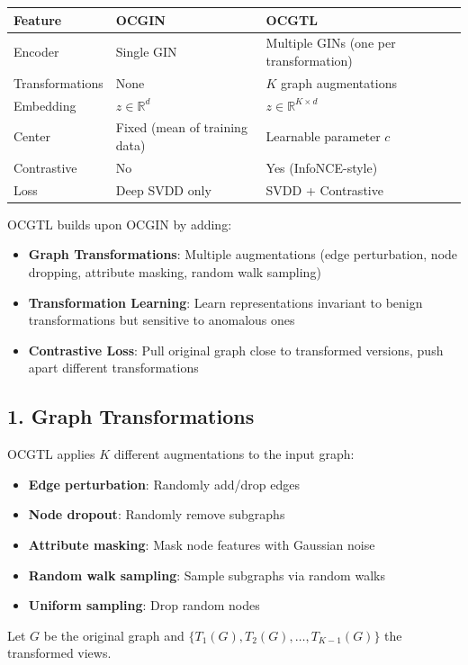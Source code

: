 \begin{table}[h]
\centering
\begin{tabular}{l|l|l}
Feature & OCGIN & OCGTL \\ \hline
Encoder & Single GIN & Multiple GINs (one per transformation) \\
Transformations & None & $K$ graph augmentations \\
Embedding & $z \in \mathbb{R}^{d}$ & $z \in \mathbb{R}^{K \times d}$ \\
Center & Fixed (mean of training data) & Learnable parameter $c$ \\
Contrastive & No & Yes (InfoNCE-style) \\
Loss & Deep SVDD only & SVDD + Contrastive
\end{tabular}
\end{table}

OCGTL builds upon OCGIN by adding:
\begin{itemize}
    \item \textbf{Graph Transformations}: Multiple augmentations (edge perturbation, node dropping, attribute masking, random walk sampling)
    \item \textbf{Transformation Learning}: Learn representations invariant to benign transformations but sensitive to anomalous ones
    \item \textbf{Contrastive Loss}: Pull original graph close to transformed versions, push apart different transformations
\end{itemize}

\subsection{1. Graph Transformations}
OCGTL applies $K$ different augmentations to the input graph:
\begin{itemize}
    \item \textbf{Edge perturbation}: Randomly add/drop edges
    \item \textbf{Node dropout}: Randomly remove subgraphs
    \item \textbf{Attribute masking}: Mask node features with Gaussian noise
    \item \textbf{Random walk sampling}: Sample subgraphs via random walks
    \item \textbf{Uniform sampling}: Drop random nodes
\end{itemize}

Let $G$ be the original graph and $\{T_1(G), T_2(G), \dots, T_{K-1}(G)\}$ the transformed views.

